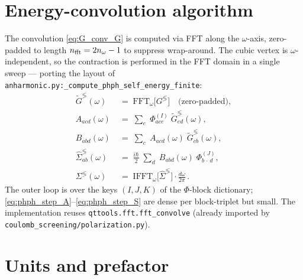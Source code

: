 \section{Energy-convolution algorithm}
\label{sec:phph_algorithm}

The convolution \eqref{eq:G_conv_G} is computed via FFT along the
$\omega$-axis, zero-padded to length
$n_{\rm fft}=2n_\omega-1$ to suppress wrap-around. The cubic vertex is
$\omega$-independent, so the contraction is performed in the FFT domain
in a single sweep — porting the layout of
\texttt{anharmonic.py:\_compute\_phph\_self\_energy\_finite}:
\begin{align}
  \tilde G^{\lessgtr}(\omega)
    &\;=\; \mathrm{FFT}_\omega\bigl[G^{\lessgtr}\bigr]
        \quad\text{(zero-padded)},
        \label{eq:phph_step_FFT}\\
  A_{a c d}(\omega)
    &\;=\; \sum_{e}\;\Phi^{(I)}_{a c e}\;\tilde G^{\lessgtr}_{e d}(\omega),
        \label{eq:phph_step_A}\\
  B_{a b d}(\omega)
    &\;=\; \sum_{c}\;A_{a c d}(\omega)\;\tilde G^{\lessgtr}_{c b}(\omega),
        \label{eq:phph_step_B}\\
  \widehat\Sigma^{\lessgtr}_{a b}(\omega)
    &\;=\; \frac{i\hbar}{2}\;
           \sum_{d}\;B_{a b d}(\omega)\;\Phi^{(J)}_{b\,\cdot\,d},
        \label{eq:phph_step_S}\\
  \Sigma^{\lessgtr}(\omega)
    &\;=\; \mathrm{IFFT}_\omega\bigl[\widehat\Sigma^{\lessgtr}\bigr]
           \cdot \frac{d\omega}{2\pi}\,.
        \label{eq:phph_step_IFFT}
\end{align}
The outer loop is over the keys $(I,J,K)$ of the
$\Phi$-block dictionary; \eqref{eq:phph_step_A}--\eqref{eq:phph_step_S}
are dense per block-triplet but small. The implementation reuses
\texttt{qttools.fft.fft\_convolve} (already imported by
\texttt{coulomb\_screening/polarization.py}).

\section{Units and prefactor}
\label{sec:phph_units}

